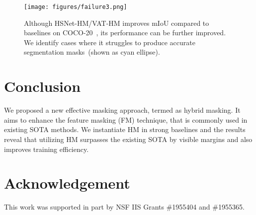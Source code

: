 \documentclass[runningheads]{llncs}
\begin{document}
\begin{figure}[!htp]
\centering
\texttt{[image: figures/failure3.png]}
\caption{ \small Although HSNet-HM/VAT-HM improves mIoU compared to baselines on COCO-20~\cite{lin2015microsoft}, its performance can be further improved. We identify cases where it struggles to produce accurate segmentation masks~(shown as cyan ellipse).} 
\label{fig:failure_case}
\end{figure}
\vspace{-8mm}
\section{Conclusion}
We proposed a new effective masking approach, termed as hybrid masking. It aims to enhance the feature masking (FM) technique, that is commonly used in existing SOTA methods. We instantiate HM in strong baselines and the results reveal that utilizing HM surpasses the existing SOTA by visible margins and also improves training efficiency. 

\section*{Acknowledgement}
This work was supported in part by NSF IIS Grants \#1955404 and \#1955365.








\end{document}
